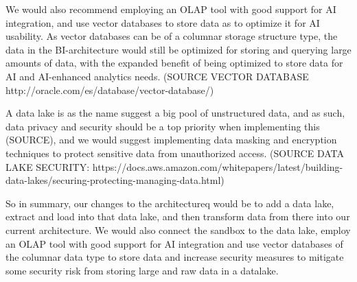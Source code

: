 We would also recommend employing an OLAP tool with good support for AI integration, and use vector databases to store data as to optimize it for AI usability.
As vector databases can be of a columnar storage structure type, the data in the BI-architecture would still be optimized for storing and querying large amounts of data,
with the expanded benefit of being optimized to store data for AI and AI-enhanced analytics needs.
(SOURCE VECTOR DATABASE http://oracle.com/es/database/vector-database/)

A data lake is as the name suggest a big pool of unstructured data, and as such, data privacy and security should be a top priority when implementing this (SOURCE), 
and we would suggest implementing data masking and encryption techniques to protect sensitive data from unauthorized access.
(SOURCE DATA LAKE SECURITY: https://docs.aws.amazon.com/whitepapers/latest/building-data-lakes/securing-protecting-managing-data.html)

So in summary, our changes to the architectureq would be to add a data lake, extract and load into that data lake, 
and then transform data from there into our current architecture.
We would also connect the sandbox to the data lake, employ an OLAP tool with good support for AI integration and 
use vector databases of the columnar data type to store data and 
increase security measures to mitigate some security risk from storing large and raw data in a datalake.

